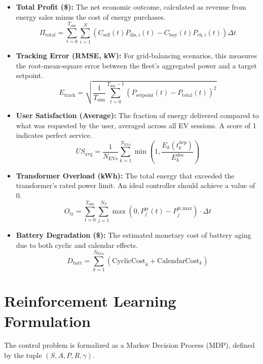 \begin{itemize}
    \item \textbf{Total Profit (\$):} The net economic outcome, calculated as revenue from energy sales minus the cost of energy purchases.
    \[
    \Pi_{\text{total}} = \sum_{t=0}^{T_{\text{sim}}} \sum_{i=1}^{N} \left( C_{\text{sell}}(t) P_{\text{dis},i}(t) - C_{\text{buy}}(t) P_{\text{ch},i}(t) \right) \Delta t
    \]
    
    \item \textbf{Tracking Error (RMSE, kW):} For grid-balancing scenarios, this measures the root-mean-square error between the fleet's aggregated power and a target setpoint.
    \[
    E_{\text{track}} = \sqrt{\frac{1}{T_{\text{sim}}} \sum_{t=0}^{T_{\text{sim}}-1} \left( P_{\text{setpoint}}(t) - P_{\text{total}}(t) \right)^2}
    \]
    
    \item \textbf{User Satisfaction (Average):} The fraction of energy delivered compared to what was requested by the user, averaged across all EV sessions. A score of 1 indicates perfect service.
    \[
    US_{\text{avg}} = \frac{1}{N_{\text{EVs}}} \sum_{k=1}^{N_{\text{EVs}}} \min \left(1, \frac{E_k(t_k^{\text{dep}})}{E_k^{\text{des}}} \right)
    \]
    
    \item \textbf{Transformer Overload (kWh):} The total energy that exceeded the transformer's rated power limit. An ideal controller should achieve a value of 0.
    \[
    O_{\text{tr}} = \sum_{t=0}^{T_{\text{sim}}} \sum_{j=1}^{N_T} \max(0, P_j^{\text{tr}}(t) - P_j^{\text{tr,max}}) \cdot \Delta t
    \]
    
    \item \textbf{Battery Degradation (\$):} The estimated monetary cost of battery aging due to both cyclic and calendar effects.
    \[
    D_{\text{batt}} = \sum_{k=1}^{N_{\text{EVs}}} (\text{CyclicCost}_k + \text{CalendarCost}_k)
    \]
\end{itemize}

\section{Reinforcement Learning Formulation}
The control problem is formalized as a Markov Decision Process (MDP), defined by the tuple $(S, A, P, R, \gamma)$.

